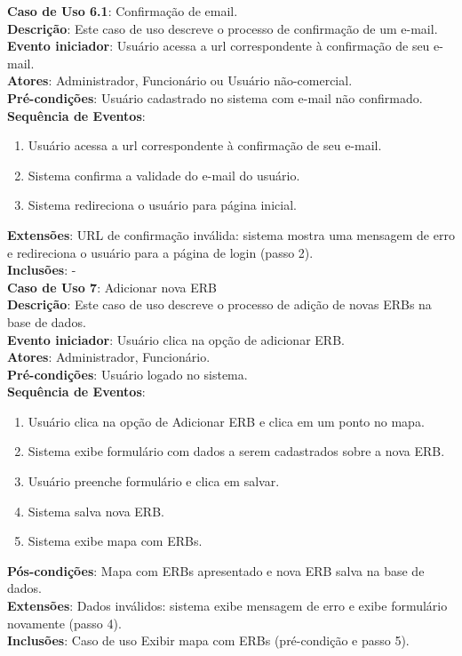 \documentclass[]{politex}
\begin{document}
\noindent \textbf{Caso de Uso 6.1}: Confirmação de email. \\
\textbf{Descrição}: Este caso de uso descreve o processo de confirmação de um e-mail. \\
\textbf{Evento iniciador}: Usuário acessa a url correspondente à confirmação de seu e-mail. \\
\textbf{Atores}: Administrador, Funcionário ou Usuário não-comercial. \\
\textbf{Pré-condições}: Usuário cadastrado no sistema com e-mail não confirmado. \\
\textbf{Sequência de Eventos}:
\begin{enumerate}
\item Usuário acessa a url correspondente à confirmação de seu e-mail.
\item Sistema confirma a validade do e-mail do usuário.
\item Sistema redireciona o usuário para página inicial.
\end{enumerate}
\textbf{Extensões}: URL de confirmação inválida: sistema mostra uma mensagem de
erro e redireciona o usuário para a página de login (passo 2). \\
\textbf{Inclusões}: - \\

\noindent \textbf{Caso de Uso 7}: Adicionar nova ERB \\
\textbf{Descrição}: Este caso de uso descreve o processo de adição de novas
ERBs na base de dados. \\
\textbf{Evento iniciador}: Usuário clica na opção de adicionar ERB. \\
\textbf{Atores}: Administrador, Funcionário. \\
\textbf{Pré-condições}: Usuário logado no sistema. \\
\textbf{Sequência de Eventos}:
\begin{enumerate}
\item Usuário clica na opção de Adicionar ERB e clica em um ponto no mapa.
\item Sistema exibe formulário com dados a serem cadastrados sobre a nova ERB.
\item Usuário preenche formulário e clica em salvar.
\item Sistema salva nova ERB.
\item Sistema exibe mapa com ERBs.
\end{enumerate}
\textbf{Pós-condições}: Mapa com ERBs apresentado e nova ERB salva na base de
dados. \\
\textbf{Extensões}: Dados inválidos: sistema exibe mensagem de erro e exibe
formulário novamente (passo 4). \\
\textbf{Inclusões}: Caso de uso Exibir mapa com ERBs (pré-condição e passo 5).\\
\end{document}
